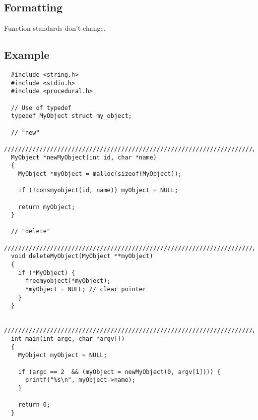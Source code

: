 \documentclass{article}
\begin{document}
\subsection{Formatting}
Function standards don't change.

\pagebreak

\subsection{Example}

\begin{lstlisting}
  #include <string.h>
  #include <stdio.h>
  #include <procedural.h>

  // Use of typedef
  typedef MyObject struct my_object;

  // "new"
  ////////////////////////////////////////////////////////////////////////////////
  MyObject *newMyObject(int id, char *name)
  {
    MyObject *myObject = malloc(sizeof(MyObject));
    
    if (!consmyobject(id, name)) myObject = NULL;

    return myObject;
  }

  // "delete"
  ////////////////////////////////////////////////////////////////////////////////
  void deleteMyObject(MyObject **myObject)
  {
    if (*MyObject) {
      freemyobject(*myObject);
      *myObject = NULL; // clear pointer
    }
  }

  ////////////////////////////////////////////////////////////////////////////////
  int main(int argc, char *argv[])
  {
    MyObject myObject = NULL;

    if (argc == 2  && (myObject = newMyObject(0, argv[1]))) {
      printf("%s\n", myObject->name);
    }

    return 0;
  }

\end{lstlisting}
\end{document}
